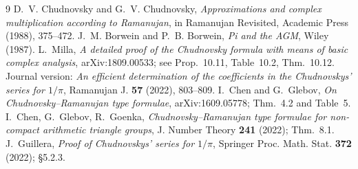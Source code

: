 \documentclass[11pt]{article}
\theoremstyle{remark}
\begin{document}
\begin{thebibliography}{9}
D.~V. Chudnovsky and G.~V. Chudnovsky,
\emph{Approximations and complex multiplication according to
Ramanujan}, in Ramanujan Revisited, Academic Press (1988), 375--472.
J.~M. Borwein and P.~B. Borwein, \emph{Pi and the AGM}, Wiley (1987).
L.~Milla, \emph{A detailed proof of the Chudnovsky formula with means
of basic complex analysis}, arXiv:1809.00533; see Prop.~10.11,
Table~10.2, Thm.~10.12.  Journal version: \emph{An efficient
determination of the coefficients in the Chudnovskys' series for
$1/\pi$}, Ramanujan J. \textbf{57} (2022), 803--809.
I.~Chen and G.~Glebov, \emph{On Chudnovsky--Ramanujan type formulae},
arXiv:1609.05778; Thm.~4.2 and Table~5.
I.~Chen, G.~Glebov, R.~Goenka, \emph{Chudnovsky--Ramanujan type
formulae for non-compact arithmetic triangle groups},
J. Number Theory \textbf{241} (2022); Thm.~8.1.
J.~Guillera, \emph{Proof of Chudnovskys' series for $1/\pi$},
Springer Proc. Math. Stat. \textbf{372} (2022); \S5.2.3.
\end{thebibliography}
\end{document}
